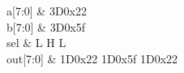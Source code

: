 \begin{tikztimingtable} [xscale=2.0]
	a[7:0] & 3D{0x22} \\
	b[7:0] & 3D{0x5f} \\
	sel & L H L\\
	out[7:0] & 1D{0x22} 1D{0x5f}  1D{0x22} \\
\end{tikztimingtable}
